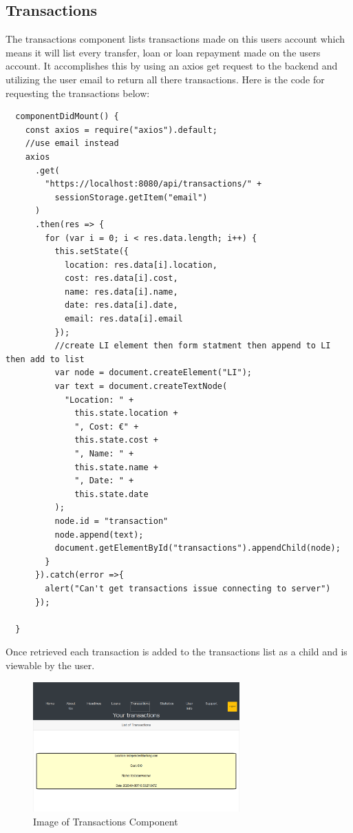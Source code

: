 \subsection{Transactions}
The transactions component lists transactions made on this users account which means it
will list every transfer, loan or loan repayment made on the users account.  It accomplishes
this by using an axios get request to the backend and utilizing the user email to return all
there transactions.  Here is the code for requesting the transactions below:
\begin{verbatim}
  componentDidMount() {
    const axios = require("axios").default;
    //use email instead
    axios
      .get(
        "https://localhost:8080/api/transactions/" +
          sessionStorage.getItem("email")
      )
      .then(res => {
        for (var i = 0; i < res.data.length; i++) {
          this.setState({
            location: res.data[i].location,
            cost: res.data[i].cost,
            name: res.data[i].name,
            date: res.data[i].date,
            email: res.data[i].email
          });
          //create LI element then form statment then append to LI then add to list
          var node = document.createElement("LI");
          var text = document.createTextNode(
            "Location: " +
              this.state.location +
              ", Cost: €" +
              this.state.cost +
              ", Name: " +
              this.state.name +
              ", Date: " +
              this.state.date
          );
          node.id = "transaction"
          node.append(text);
          document.getElementById("transactions").appendChild(node);
        }
      }).catch(error =>{
        alert("Can't get transactions issue connecting to server")
      });

  }
\end{verbatim}
Once retrieved each transaction is added to the transactions list as a child and is viewable by the user.
\begin{figure}[H]
\includegraphics[width=\textwidth,height=5cm]{img/transactionscomponent.png}
\caption{Image of Transactions Component}
\label{fig:Image of transactions component}
\end{figure}
